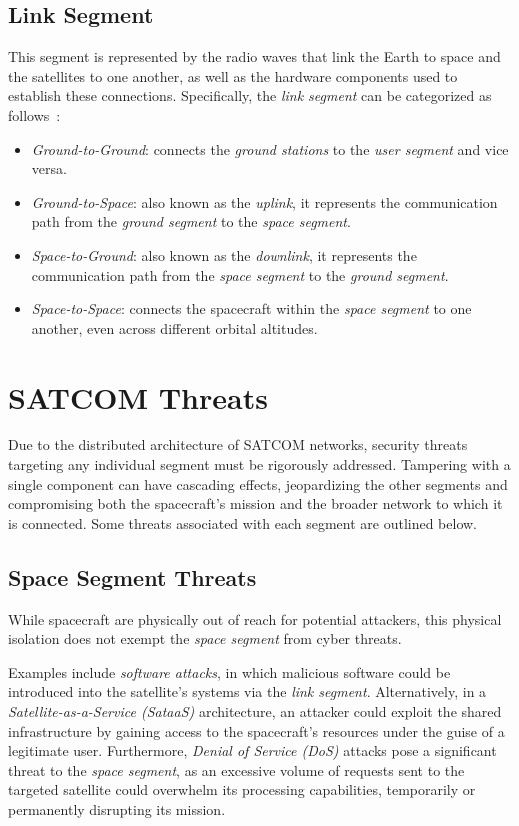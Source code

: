 \documentclass[11pt,a4paper]{report}
\begin{document}
\subsection{Link Segment}
This segment is represented by the radio waves that link the Earth to space and the satellites to one another, as well as the hardware 
components used to establish these connections. Specifically, the \textit{link segment} can be categorized as follows~\cite[p. 381]{aLotOfReferences}:
\begin{itemize}
    \item \textit{Ground-to-Ground}: connects the \textit{ground stations} to the \textit{user segment} and vice versa.

    \item \textit{Ground-to-Space}: also known as the \textit{uplink}, it represents the communication path from the \textit{ground segment} 
    to the \textit{space segment}.

    \item \textit{Space-to-Ground}: also known as the \textit{downlink}, it represents the communication path from the \textit{space segment} 
    to the \textit{ground segment}.

    \item \textit{Space-to-Space}: connects the spacecraft within the \textit{space segment} to one another, even across different orbital altitudes.
\end{itemize}

\section{SATCOM Threats}
Due to the distributed architecture of SATCOM networks, security threats targeting any individual segment must be rigorously addressed. 
Tampering with a single component can have cascading effects, jeopardizing the other segments and compromising both the spacecraft's mission and the 
broader network to which it is connected. Some threats associated with each segment are outlined below.

\subsection{Space Segment Threats}
While spacecraft are physically out of reach for potential attackers, this physical isolation does not exempt the \textit{space segment} from cyber threats.

Examples include \textit{software attacks}, in which malicious software could be introduced into the satellite's systems via the \textit{link segment}.
Alternatively, in a \textit{Satellite-as-a-Service (SataaS)} architecture, an attacker could exploit the shared infrastructure by gaining access to the spacecraft's resources under the guise of a legitimate user. 
Furthermore, \textit{Denial of Service (DoS)} attacks pose a significant threat to the \textit{space segment}, as an excessive volume of requests sent to the targeted satellite could overwhelm its processing capabilities, temporarily or permanently disrupting its mission.
\end{document}
